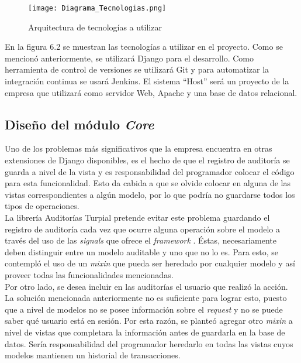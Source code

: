 \begin{figure}
\centering
\texttt{[image: Diagrama\_Tecnologias.png]}
\caption{Arquitectura de tecnologías a utilizar}
\label{fig:figure6.2}
\end{figure}

En la figura 6.2 se muestran las tecnologías a utilizar en el proyecto. Como se mencionó anteriormente, se utilizará Django para el desarrollo. Como herramienta de control de versiones se utilizará Git y para automatizar la integración continua se usará Jenkins. El sistema “Host” será un proyecto de la empresa que utilizará como servidor Web, Apache y una base de datos relacional.

\subsection{Diseño del módulo \textit{Core}}

Uno de los problemas más significativos que la empresa encuentra en otras extensiones de Django disponibles, es el hecho de que el registro de auditoría se guarda a nivel de la vista y es responsabilidad del programador colocar el código para esta funcionalidad. Esto da cabida a que se olvide colocar en alguna de las vistas correspondientes a algún modelo, por lo que podría no guardarse todos los tipos de operaciones. \\

La librería Auditorías Turpial pretende evitar este problema guardando el registro de auditoría cada vez que ocurre alguna operación sobre el modelo a través del uso de las \textit{signals} que ofrece el \textit{framework} . Éstas, necesariamente deben distinguir entre un modelo auditable y uno que no lo es. Para esto, se contempló el uso de un \textit{mixin} que pueda ser heredado por cualquier modelo y así proveer todas las funcionalidades mencionadas. \\

Por otro lado, se desea incluir en las auditorías el usuario que realizó la acción. La solución mencionada anteriormente no es suficiente para lograr esto, puesto que a nivel de modelos no se posee información sobre el \textit{request} y no se puede saber qué usuario está en sesión. Por esta razón, se planteó agregar otro \textit{mixin} a nivel de vistas que completara la información antes de guardarla en la base de datos. Sería responsabilidad del programador heredarlo en todas las vistas cuyos modelos mantienen un historial de transacciones.\\

